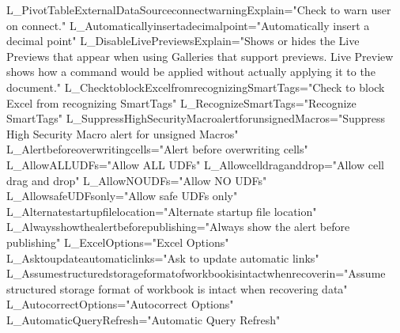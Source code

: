  
 L _ P i v o t T a b l e E x t e r n a l D a t a S o u r c e c o n n e c t w a r n i n g E x p l a i n = " C h e c k   t o   w a r n   u s e r   o n   c o n n e c t . " 
 
 L _ A u t o m a t i c a l l y i n s e r t a d e c i m a l p o i n t = " A u t o m a t i c a l l y   i n s e r t   a   d e c i m a l   p o i n t " 
 
 L _ D i s a b l e L i v e P r e v i e w s E x p l a i n = " S h o w s   o r   h i d e s   t h e   L i v e   P r e v i e w s   t h a t   a p p e a r   w h e n   u s i n g   G a l l e r i e s   t h a t   s u p p o r t   p r e v i e w s .     L i v e   P r e v i e w   s h o w s   h o w   a   c o m m a n d   w o u l d   b e   a p p l i e d   w i t h o u t   a c t u a l l y   a p p l y i n g   i t   t o   t h e   d o c u m e n t . " 
 
 L _ C h e c k t o b l o c k E x c e l f r o m r e c o g n i z i n g S m a r t T a g s = " C h e c k   t o   b l o c k   E x c e l   f r o m   r e c o g n i z i n g   S m a r t T a g s " 
 
 L _ R e c o g n i z e S m a r t T a g s = " R e c o g n i z e   S m a r t T a g s " 
 
 L _ S u p p r e s s H i g h S e c u r i t y M a c r o a l e r t f o r u n s i g n e d M a c r o s = " S u p p r e s s   H i g h   S e c u r i t y   M a c r o   a l e r t   f o r   u n s i g n e d   M a c r o s " 
 
 L _ A l e r t b e f o r e o v e r w r i t i n g c e l l s = " A l e r t   b e f o r e   o v e r w r i t i n g   c e l l s " 
 
 L _ A l l o w A L L U D F s = " A l l o w   A L L   U D F s " 
 
 L _ A l l o w c e l l d r a g a n d d r o p = " A l l o w   c e l l   d r a g   a n d   d r o p " 
 
 L _ A l l o w N O U D F s = " A l l o w   N O   U D F s " 
 
 L _ A l l o w s a f e U D F s o n l y = " A l l o w   s a f e   U D F s   o n l y " 
 
 L _ A l t e r n a t e s t a r t u p f i l e l o c a t i o n = " A l t e r n a t e   s t a r t u p   f i l e   l o c a t i o n " 
 
 L _ A l w a y s s h o w t h e a l e r t b e f o r e p u b l i s h i n g = " A l w a y s   s h o w   t h e   a l e r t   b e f o r e   p u b l i s h i n g " 
 
 L _ E x c e l O p t i o n s = " E x c e l   O p t i o n s " 
 
 L _ A s k t o u p d a t e a u t o m a t i c l i n k s = " A s k   t o   u p d a t e   a u t o m a t i c   l i n k s " 
 
 L _ A s s u m e s t r u c t u r e d s t o r a g e f o r m a t o f w o r k b o o k i s i n t a c t w h e n r e c o v e r i n = " A s s u m e   s t r u c t u r e d   s t o r a g e   f o r m a t   o f   w o r k b o o k   i s   i n t a c t   w h e n   r e c o v e r i n g   d a t a " 
 
 L _ A u t o c o r r e c t O p t i o n s = " A u t o c o r r e c t   O p t i o n s " 
 
 L _ A u t o m a t i c Q u e r y R e f r e s h = " A u t o m a t i c   Q u e r y   R e f r e s h " 
